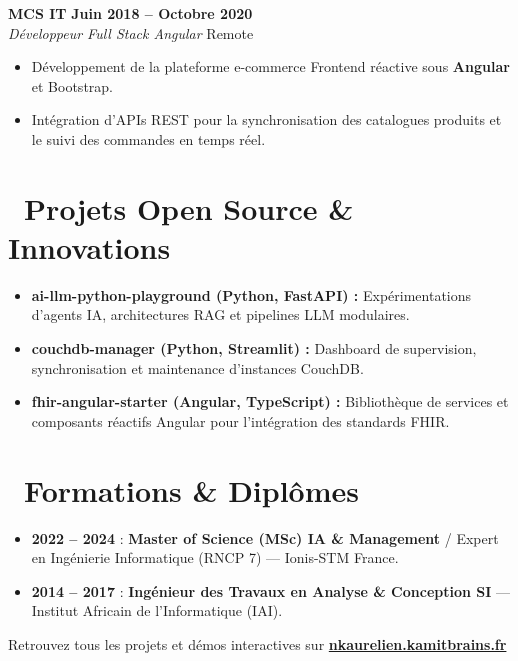 \documentclass[10pt,a4paper]{article}
\begin{document}
\vspace{0.35em}

\textbf{\large MCS IT} \hfill {\bfseries\small\color{slateGray} Juin 2018 -- Octobre 2020} \\
\emph{\color{primary}Développeur Full Stack Angular} \hfill {\small Remote}
\begin{itemize}[leftmargin=1.4em, itemsep=0.18em, topsep=0.15em]
    \item Développement de la plateforme e-commerce Frontend réactive sous \textbf{Angular} et Bootstrap.
    \item Intégration d'APIs REST pour la synchronisation des catalogues produits et le suivi des commandes en temps réel.
\end{itemize}

\section{\faRocket\ Projets Open Source \& Innovations}
\begin{itemize}[leftmargin=1.4em, itemsep=0.25em, topsep=0.15em]
    \item \textbf{ai-llm-python-playground (Python, FastAPI) :} Expérimentations d'agents IA, architectures RAG et pipelines LLM modulaires.
    \item \textbf{couchdb-manager (Python, Streamlit) :} Dashboard de supervision, synchronisation et maintenance d'instances CouchDB.
    \item \textbf{fhir-angular-starter (Angular, TypeScript) :} Bibliothèque de services et composants réactifs Angular pour l'intégration des standards FHIR.
\end{itemize}

\section{\faGraduationCap\ Formations \& Diplômes}
\begin{itemize}[leftmargin=1.4em, itemsep=0.25em, topsep=0.15em]
    \item \textbf{2022 -- 2024} : \textbf{Master of Science (MSc) IA \& Management} / Expert en Ingénierie Informatique (RNCP 7) --- Ionis-STM France.
    \item \textbf{2014 -- 2017} : \textbf{Ingénieur des Travaux en Analyse \& Conception SI} --- Institut Africain de l'Informatique (IAI).
\end{itemize}

\vspace{0.8em}
\begin{center}
    \footnotesize\color{slateGray}
    Retrouvez tous les projets et démos interactives sur \href{https://nkaurelien.kamitbrains.fr}{\textbf{nkaurelien.kamitbrains.fr}}
\end{center}
\end{document}
